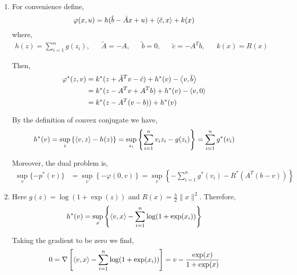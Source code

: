\documentclass[10pt]{article}
\begin{document}
\begin{solution}[Solution]
\begin{enumerate}[label=(\alph*)]
    \item

        For convenience define,
        \begin{align*}
            \varphi(x,u) = h(\tilde{b}-\tilde{A}x+u) + \ip{\tilde{c},x} + k(x) %
        \end{align*}
        where,
        \begin{align*}
            h(z) = \sum_{i=1}^{n}g(z_i)
            ,&&
            \tilde{A} = -A
            ,&&
            \tilde{b} = 0
            ,&&
            \tilde{c} = -A^Tb
            ,&&
            k(x) = R(x)
        \end{align*}

        Then,
        \begin{align*}
            \varphi^*(z,v) &= k^*(z+\tilde{A}^Tv-\tilde{c}) + h^*(v) - \left\langle v,\tilde{b} \right\rangle
            \\&= k^*(z-A^Tv+A^Tb) + h^*(v) - \left\langle v,0 \right\rangle
            \\&= k^*(z-A^T(v-b)) + h^*(v)
        \end{align*}
        
        By the definition of convex conjugate we have,
        \begin{align*}
            h^*(v) = \sup_{z} \left\{ \left\langle v,z \right\rangle - h(z) \right\}
            = \sup_{z_i} \left\{ \sum_{i=1}^{n} v_iz_i - g(z_i) \right\}
            = \sum_{i=1}^{n} g^*(v_i)
        \end{align*}
        

        Moreover, the dual problem is,
        \begin{align*}
             \sup_v \{ - p^*(v) \}
             &= \sup_v \left\{ - \varphi(0,v) \right\}
             =\sup_v \left\{ -\sum_{i=1}^{n}g^*(v_i) - R^*(A^T(b-v)) \right\}
        \end{align*}
        
    \item Here \( g(z) = \log(1+\exp(z)) \) and \( R(x) = \frac{\lambda}{2}\| x \|^2 \).
        Therefore,
        \begin{align*}
            h^*(v) = \sup_{x} \left\{ \left\langle v,x \right\rangle - \sum_{i=1}^{n} \log(1+\exp(x_i)) \right\}
        \end{align*}
        
        Taking the gradient to be zero we find,
        \begin{align*}
            0 = \nabla \left[ \left\langle v,x \right\rangle - \sum_{i=1}^{n} \log(1+\exp(x_i)) \right]
            = v - \frac{\exp(x)}{1+\exp(x)}
        \end{align*}


\end{enumerate}
\end{solution}
\end{document}
